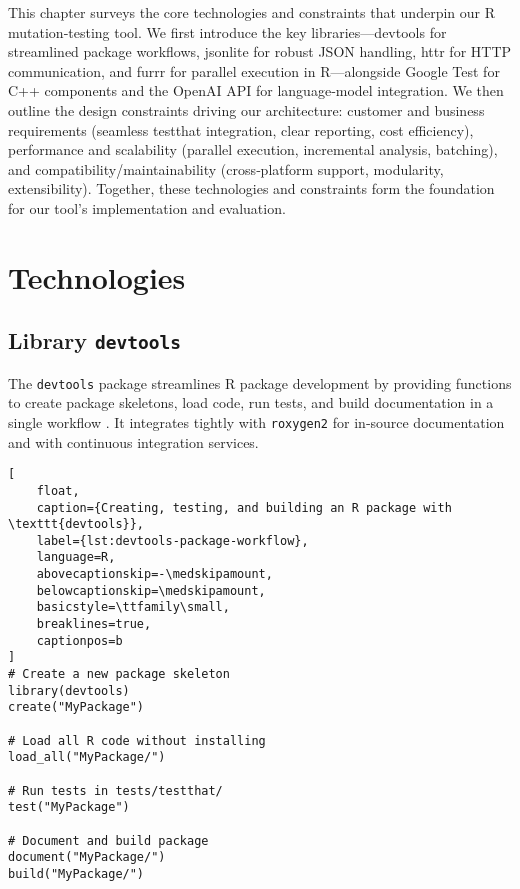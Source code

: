 
\begin{chapterabstract}
This chapter surveys the core technologies and constraints that underpin our R mutation‐testing tool. We first introduce the key libraries—devtools for streamlined package workflows, jsonlite for robust JSON handling, httr for HTTP communication, and furrr for parallel execution in R—alongside Google Test for C++ components and the OpenAI API for language‐model integration. We then outline the design constraints driving our architecture: customer and business requirements (seamless testthat integration, clear reporting, cost efficiency), performance and scalability (parallel execution, incremental analysis, batching), and compatibility/maintainability (cross‐platform support, modularity, extensibility). Together, these technologies and constraints form the foundation for our tool’s implementation and evaluation.
\end{chapterabstract}

\section{Technologies}

\subsection{Library \texttt{devtools}}

The \texttt{devtools} package streamlines R package development by providing functions to create package skeletons, load code, run tests, and build documentation in a single workflow \cite{wickham2019devtools}. It integrates tightly with \texttt{roxygen2} for in‐source documentation and with continuous integration services.

\begin{lstlisting}[
    float,
    caption={Creating, testing, and building an R package with \texttt{devtools}},
    label={lst:devtools-package-workflow},
    language=R,
    abovecaptionskip=-\medskipamount,
    belowcaptionskip=\medskipamount,
    basicstyle=\ttfamily\small,
    breaklines=true,
    captionpos=b
]
# Create a new package skeleton
library(devtools)
create("MyPackage")

# Load all R code without installing
load_all("MyPackage/")

# Run tests in tests/testthat/
test("MyPackage")

# Document and build package
document("MyPackage/")
build("MyPackage/")
\end{lstlisting}


